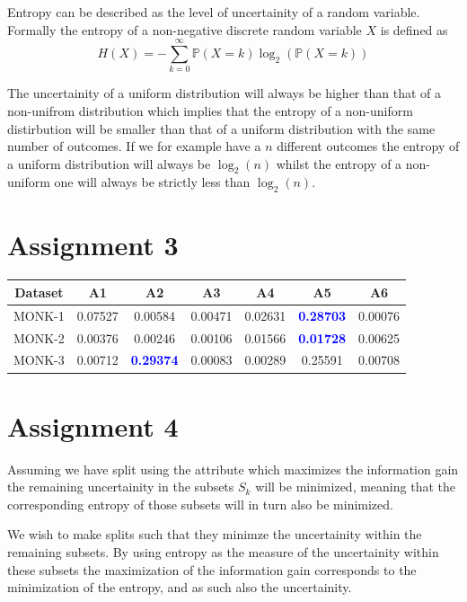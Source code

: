 \documentclass{article}
\begin{document}
Entropy can be described as the level of uncertainity of a random variable. Formally the entropy of a non-negative discrete random variable $X$ is defined as
$$
H(X) = -\sum_{k=0}^{\infty}\mathbb{P}(X=k)\log_2(\mathbb{P}(X=k))
$$

The uncertainity of a uniform distribution will always be higher than that of a non-unifrom distribution which implies that the entropy of a non-uniform distirbution will be smaller than that of a uniform distribution with the same number of outcomes. If we for example have a $n$ different outcomes the entropy of a uniform distribution will always be $\log_2(n)$ whilst the entropy of a non-uniform one will always be strictly less than $\log_2(n)$.


\section*{Assignment 3}

\begin{center}
 \begin{tabular}{|c | c c c c c c |} 
 \hline
 Dataset & A1 & A2 & A3 & A4 & A5 & A6 \\ [0.5ex] 
 \hline \hline
 MONK-1 & 0.07527 & 0.00584 & 0.00471 & 0.02631 & \textcolor{blue}{\textbf{0.28703}} & 0.00076 \\ 
 MONK-2 & 0.00376 & 0.00246 & 0.00106 & 0.01566 & \textcolor{blue}{\textbf{0.01728}} & 0.00625 \\ 
 MONK-3 & 0.00712 & \textcolor{blue}{\textbf{0.29374}} & 0.00083 & 0.00289 & 0.25591 & 0.00708  \\ [1ex] 
 \hline
\end{tabular}
\end{center}


\section*{Assignment 4}

Assuming we have split using the attribute which maximizes the information gain the remaining uncertainity in the subsets $S_k$ will be minimized, meaning that the corresponding entropy of those subsets will in turn also be minimized. 

We wish to make splits such that they minimze the uncertainity within the remaining subsets. By using entropy as the measure of the uncertainity within these subsets the maximization of the information gain corresponds to the minimization of the entropy, and as such also the uncertainity. 
\end{document}
